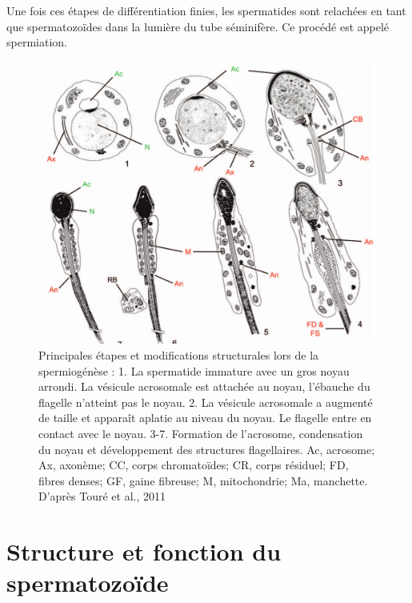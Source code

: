 \documentclass[12pt,twoside]{reedthesis}
\theoremstyle{definition}
\theoremstyle{definition}
\theoremstyle{remark}
\begin{document}
  Une fois ces étapes de différentiation finies, les spermatides sont
  relachées en tant que spermatozoïdes dans la lumière du tube séminifère.
  Ce procédé est appelé spermiation.
  
  \begin{figure}
  
  {\centering \includegraphics[scale=0.3]{figure/spermiogenese} 
  
  }
  
  \caption[Principales étapes et modifications structurales lors de la spermiogénèse]{Principales étapes et modifications structurales lors de la spermiogénèse : 1. La spermatide immature avec un gros noyau arrondi. La vésicule acrosomale est attachée au noyau, l’ébauche du flagelle n’atteint pas le noyau. 2. La vésicule acrosomale a augmenté de taille et apparaît aplatie au niveau du noyau. Le flagelle entre en contact avec le noyau. 3-7. Formation de l’acrosome, condensation du noyau et développement des structures flagellaires. Ac, acrosome; Ax, axonème; CC, corps chromatoïdes; CR, corps résiduel; FD, fibres denses; GF, gaine fibreuse; M, mitochondrie; Ma, manchette. D’après Touré et al., 2011}\label{fig:spermiogenese}
  \end{figure}
  
  \section{Structure et fonction du
  spermatozoïde}\label{structure-et-fonction-du-spermatozoide}
  
\end{document}
